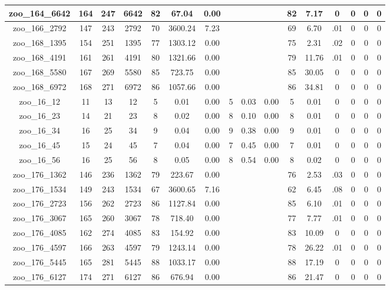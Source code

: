 \begin{landscape}
\begin{longtable}{|c|c|c|c|c|c|c|c|c|c|c|c|c|c|c|c|}
zoo\_164\_6642 & 164 & 247 & 6642 & 82 & 67.04 & 0.00 &  &  &  & 82 & 7.17 & 0 & 0 & 0 & 0 \\ \hline 
zoo\_166\_2792 & 147 & 243 & 2792 & 70 & 3600.24 & 7.23 &  &  &  & 69 & 6.70 & .01 & 0 & 0 & 0 \\ \hline 
zoo\_168\_1395 & 154 & 251 & 1395 & 77 & 1303.12 & 0.00 &  &  &  & 75 & 2.31 & .02 & 0 & 0 & 0 \\ \hline 
zoo\_168\_4191 & 161 & 261 & 4191 & 80 & 1321.66 & 0.00 &  &  &  & 79 & 11.76 & .01 & 0 & 0 & 0 \\ \hline 
zoo\_168\_5580 & 167 & 269 & 5580 & 85 & 723.75 & 0.00 &  &  &  & 85 & 30.05 & 0 & 0 & 0 & 0 \\ \hline 
zoo\_168\_6972 & 168 & 271 & 6972 & 86 & 1057.66 & 0.00 &  &  &  & 86 & 34.81 & 0 & 0 & 0 & 0 \\ \hline 
zoo\_16\_12 & 11 & 13 & 12 & 5 & 0.01 & 0.00 & 5 & 0.03 & 0.00 & 5 & 0.01 & 0 & 0 & 0 & 0 \\ \hline 
zoo\_16\_23 & 14 & 21 & 23 & 8 & 0.02 & 0.00 & 8 & 0.10 & 0.00 & 8 & 0.01 & 0 & 0 & 0 & 0 \\ \hline 
zoo\_16\_34 & 16 & 25 & 34 & 9 & 0.04 & 0.00 & 9 & 0.38 & 0.00 & 9 & 0.01 & 0 & 0 & 0 & 0 \\ \hline 
zoo\_16\_45 & 15 & 24 & 45 & 7 & 0.04 & 0.00 & 7 & 0.45 & 0.00 & 7 & 0.01 & 0 & 0 & 0 & 0 \\ \hline 
zoo\_16\_56 & 16 & 25 & 56 & 8 & 0.05 & 0.00 & 8 & 0.54 & 0.00 & 8 & 0.02 & 0 & 0 & 0 & 0 \\ \hline 
zoo\_176\_1362 & 146 & 236 & 1362 & 79 & 223.67 & 0.00 &  &  &  & 76 & 2.53 & .03 & 0 & 0 & 0 \\ \hline 
zoo\_176\_1534 & 149 & 243 & 1534 & 67 & 3600.65 & 7.16 &  &  &  & 62 & 6.45 & .08 & 0 & 0 & 0 \\ \hline 
zoo\_176\_2723 & 156 & 262 & 2723 & 86 & 1127.84 & 0.00 &  &  &  & 85 & 6.10 & .01 & 0 & 0 & 0 \\ \hline 
zoo\_176\_3067 & 165 & 260 & 3067 & 78 & 718.40 & 0.00 &  &  &  & 77 & 7.77 & .01 & 0 & 0 & 0 \\ \hline 
zoo\_176\_4085 & 162 & 274 & 4085 & 83 & 154.92 & 0.00 &  &  &  & 83 & 10.09 & 0 & 0 & 0 & 0 \\ \hline 
zoo\_176\_4597 & 166 & 263 & 4597 & 79 & 1243.14 & 0.00 &  &  &  & 78 & 26.22 & .01 & 0 & 0 & 0 \\ \hline 
zoo\_176\_5445 & 165 & 281 & 5445 & 88 & 1033.17 & 0.00 &  &  &  & 88 & 17.19 & 0 & 0 & 0 & 0 \\ \hline 
zoo\_176\_6127 & 174 & 271 & 6127 & 86 & 676.94 & 0.00 &  &  &  & 86 & 21.47 & 0 & 0 & 0 & 0 \\ \hline 

\end{longtable}
\end{landscape}

